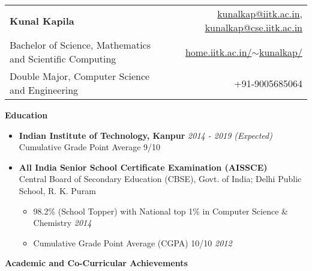 \documentclass[letterpaper,11pt]{article}
\begin{document}
{\selectfont
\begin{tabular*}{7.5in}{l@{\extracolsep{\fill}}r}
    \textbf{\Large Kunal Kapila} & \href{mailto:kunalkap@iitk.ac.in}{kunalkap@iitk.ac.in}, \href{mailto:kunalkap@cse.iitk.ac.in}{kunalkap@cse.iitk.ac.in}\\
    Bachelor of Science, Mathematics and Scientific Computing & \href{http://home.iitk.ac.in/~kunalkap/}{home.iitk.ac.in/$\sim$kunalkap/}\\
    Double Major, Computer Science and Engineering & +91-9005685064\\
    \hline
\end{tabular*}
\vspace{5pt}

\Large{\textbf{Education}}
\small
\vspace{-1pt}
\begin{itemize}
    \item
        \textbf{Indian Institute of Technology, Kanpur} \hfill \textit{2014 - 2019 (Expected)}\\
        Cumulative Grade Point Average 9/10\\
    \vspace{-3pt}
    \item
        \textbf{All India Senior School Certificate Examination (AISSCE)}\\
        Central Board of Secondary Education (CBSE), Govt. of India; Delhi Public School, R. K. Puram\\
        \vspace{-4pt}
        \begin{itemize}
            \item 98.2\% (School Topper) with National top 1\% in Computer Science \& Chemistry \hfill \textit{2014}\\
            \vspace{-2pt}
            \item Cumulative Grade Point Average (CGPA) 10/10 \hfill\textit{2012}\\
            \vspace{-2pt}
        \end{itemize}
\end{itemize}

\vspace{-1pt}
\Large{\textbf{Academic and Co-Curricular Achievements}}
\small
\vspace{-2pt}

}
\end{document}
